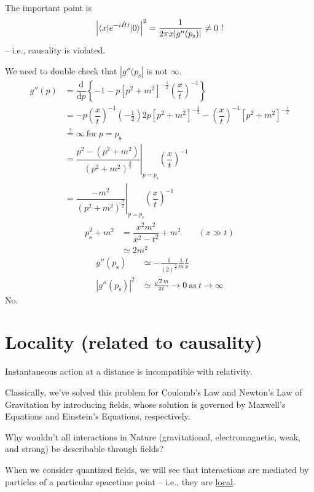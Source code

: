 \documentclass{article}
\begin{document}

\noindent The important point is
\begin{equation*}
    {\left| \braket{ x | e^{ -i \hat{H} t } | 0 } \right|}^2 = \dfrac{1}{ 2 \pi x | g'' (p_\mathrm{s}) | } \neq 0 ~ !
\end{equation*}
-- i.e., causality is violated.

\noindent We need to double check that $ | g'' (p_\mathrm{s} | $ is not $\infty$.
\begin{align*}
    g'' (p) &= \dfrac{\mathrm{d}}{\mathrm{d} p} \left\lbrace  -1 - p {[ p^2 + m^2 ]}^{-\frac{1}{2}} {\left( \dfrac{x}{t} \right)}^{-1} \right\rbrace \\
    &= - p {\left( \dfrac{x}{t} \right)}^{-1} \left( -\tfrac{1}{2} \right) 2p {[ p^2 + m^2 ]}^{-\frac{3}{2}} - {\left( \dfrac{x}{t} \right)}^{-1} {[ p^2 + m^2 ]}^{-\frac{1}{2}} \\
    &\stackrel{?}{=} \infty ~ \mathrm{for} ~ p = p_\mathrm{s} \\
    &= {\left. \dfrac{ p^2 - ( p^2 + m^2 ) }{ { ( p^2 + m^2 ) }^\frac{3}{2} } \right|}_{ p = p_\mathrm{s} } {\left( \dfrac{x}{t} \right)}^{-1} \\
    &= {\left. \dfrac{ - m^2 }{ { ( p^2 + m^2 ) }^\frac{3}{2} } \right|}_{ p = p_\mathrm{s} } {\left( \dfrac{x}{t} \right)}^{-1}
\end{align*}
\begin{align*}
    p_\mathrm{s}^2 + m^2 &= \dfrac{ x^2 m^2 }{ x^2 - t^2 } + m^2 \qquad ( x\gg t ) \\
    & \simeq 2 m^2
\end{align*}
\begin{align*}
    g'' (p_\mathrm{s}) &\simeq -\frac{1}{ {(2)}^\frac{3}{2} } \frac{1}{m} \frac{t}{x} \\
    {|g'' (p_\mathrm{s}) |}^2 &\simeq \frac{ \sqrt{2} m }{ \pi t } \longrightarrow 0 ~ \mathrm{as} ~ t \longrightarrow \infty
\end{align*}
No.

\section{Locality (related to causality)}

\noindent Instantaneous action at a distance is incompatible with relativity.

\noindent Classically, we've solved this problem for Coulomb's Law and Newton's Law of Gravitation by introducing fields, whose solution is governed by Maxwell's Equations and Einstein's Equations, respectively.


\noindent Why wouldn't all interactions in Nature (gravitational, electromagnetic, weak, and strong) be describable through fields?

\noindent When we consider quantized fields, we will see that interactions are mediated by particles of a particular spacetime point -- i.e., they are \underline{local}.
\end{document}
